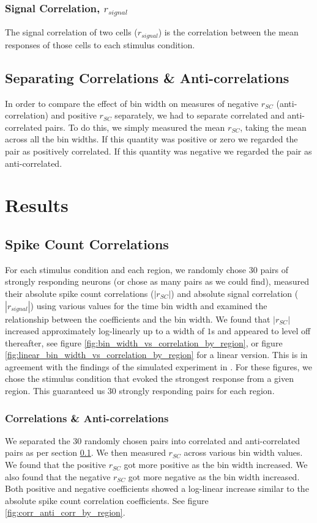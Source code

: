 \documentclass[a4paper,12pt]{article}
\theoremstyle{definition}
\begin{document}
\subsubsection{Signal Correlation, $r_{signal}$}
The signal correlation of two cells ($r_{signal}$) is the correlation between the mean responses of those cells to each stimulus condition.

\subsection{Separating Correlations \& Anti-correlations}\label{sec:corr_anti_corr}
In order to compare the effect of bin width on measures of negative $r_{SC}$ (anti-correlation) and positive $r_{SC}$ separately, we had to separate correlated and anti-correlated pairs. To do this, we simply measured the mean $r_{SC}$, taking the mean across all the bin widths. If this quantity was positive or zero we regarded the pair as positively correlated. If this quantity was negative we regarded the pair as anti-correlated.

\section{Results}
\subsection{Spike Count Correlations}
For each stimulus condition and each region, we randomly chose $30$ pairs of strongly responding neurons (or chose as many pairs as we could find), measured their absolute spike count correlations ($|r_{SC}|$) and absolute signal correlation ($|r_{signal}|$) using various values for the time bin width and examined the relationship between the coefficients and the bin width. We found that $|r_{SC}|$ increased approximately log-linearly up to a width of $1$s and appeared to level off thereafter, see figure \ref{fig:bin_width_vs_correlation_by_region}, or figure \ref{fig:linear_bin_width_vs_correlation_by_region} for a linear version. This is in agreement with the findings of the simulated experiment in \cite{cohen}. For these figures, we chose the stimulus condition that evoked the strongest response from a given region. This guaranteed us $30$ strongly responding pairs for each region.

\subsubsection{Correlations \& Anti-correlations}
We separated the $30$ randomly chosen pairs into correlated and anti-correlated pairs as per section \ref{sec:corr_anti_corr}. We then measured $r_{SC}$ across various bin width values. We found that the positive $r_{SC}$ got more positive as the bin width increased. We also found that the negative $r_{SC}$ got more negative as the bin width increased. Both positive and negative coefficients showed a log-linear increase similar to the absolute spike count correlation coefficients. See figure \ref{fig:corr_anti_corr_by_region}.
\end{document}
